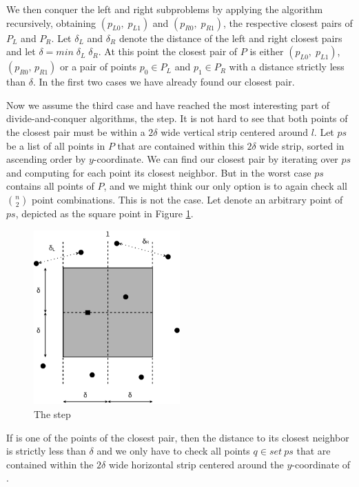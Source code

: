 \begin{isabellebody}
\begin{isamarkuptext}
We then conquer the left and right subproblems by applying the algorithm recursively,
obtaining $(p_{L0},\;p_{L1})$ and $(p_{R0},\;p_{R1})$, the respective closest pairs of $P_L$ and
$P_R$. Let $\delta_L$ and $\delta_R$ denote the distance of the left and right closest
pairs and let $\delta = \mathit{min}\;\delta_L\;\delta_R$.
At this point the closest pair of $P$ is either $(p_{L0},\; p_{L1})$,
$(p_{R0},\,p_{R1})$ or a pair of points $p_0 \in P_L$ and $p_1 \in P_R$
with a distance strictly less than $\delta$. In the first two cases we have already found our closest pair.

Now we assume the third case and have reached the most interesting part of divide-and-conquer algorithms,
the  step. It is not hard to see that both points of the closest pair
must be within a $2\delta$ wide vertical strip centered around $l$. Let $\mathit{ps}$ be a list of all points in $P$ that are contained within this $2\delta$ wide strip, sorted in ascending order by $y$-coordinate. We can find our closest pair by iterating over
$\mathit{ps}$ and computing for each point its closest neighbor. But in the worst case $\mathit{ps}$ contains all points of $P$,
and we might think our only option is to again check all $n \choose 2$ point combinations.
This is not the case. Let  denote an arbitrary point of $\mathit{ps}$, depicted as the square
point in Figure \ref{fig:Combine}.
%
\begin{figure}[htpb]
\centering
\includegraphics[width=0.5\textwidth,height=0.35\textheight]{./Combine.png}
\caption[]{The  step}
\label{fig:Combine}
\end{figure}
%
If  is one of the points of the closest pair, then the distance to its closest
neighbor is strictly less than $\delta$ and we only have to check all points $q \in \mathit{set\ ps}$
that are contained within the $2\delta$ wide horizontal strip centered around the $y$-coordinate of .


\end{isamarkuptext}
\end{isabellebody}

